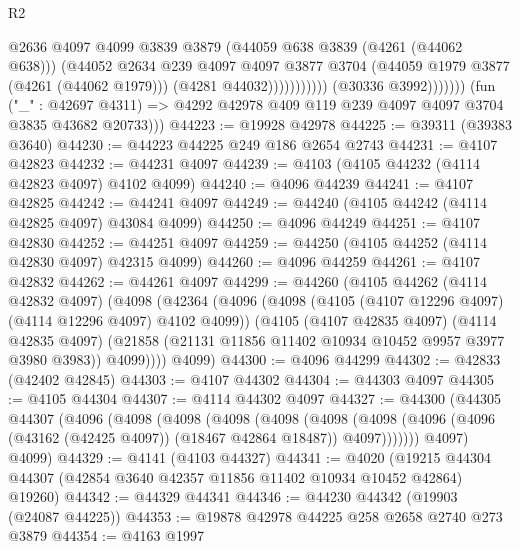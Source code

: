 \begin{lexlean}{R2}
\begin{coremodule}
                                      @2636
                                      @4097
                                      @4099
                                      @3839
                                      @3879
                                      (@44059 @638 @3839 (@4261 (@44062 @638)))
                                      (@44052
                                        @2634
                                        @239
                                        @4097
                                        @4097
                                        @3877
                                        @3704
                                        (@44059 @1979 @3877 (@4261 (@44062 @1979)))
                                        (@4281 @44032)))))))))))
                    (@30336 @3992)))))))
        (fun ("_" : @42697 @4311) =>
        @4292 @42978 @409 @119 @239 @4097 @4097 @3704 @3835 @43682 @20733)))
@44223 := @19928 @42978
@44225 := @39311 (@39383 @3640)
@44230 := @44223 @44225 @249 @186 @2654 @2743
@44231 := @4107 @42823
@44232 := @44231 @4097
@44239 := @4103 (@4105 @44232 (@4114 @42823 @4097) @4102 @4099)
@44240 := @4096 @44239
@44241 := @4107 @42825
@44242 := @44241 @4097
@44249 := @44240 (@4105 @44242 (@4114 @42825 @4097) @43084 @4099)
@44250 := @4096 @44249
@44251 := @4107 @42830
@44252 := @44251 @4097
@44259 := @44250 (@4105 @44252 (@4114 @42830 @4097) @42315 @4099)
@44260 := @4096 @44259
@44261 := @4107 @42832
@44262 := @44261 @4097
@44299 := @44260
    (@4105
      @44262
      (@4114 @42832 @4097)
      (@4098
        (@42364
          (@4096
            (@4098 (@4105 (@4107 @12296 @4097) (@4114 @12296 @4097) @4102 @4099))
            (@4105
              (@4107 @42835 @4097)
              (@4114 @42835 @4097)
              (@21858 (@21131 @11856 @11402 @10934 @10452 @9957 @3977 @3980 @3983))
              @4099))))
      @4099)
@44300 := @4096 @44299
@44302 := @42833 (@42402 @42845)
@44303 := @4107 @44302
@44304 := @44303 @4097
@44305 := @4105 @44304
@44307 := @4114 @44302 @4097
@44327 := @44300
    (@44305
      @44307
      (@4096
        (@4098
          (@4098
            (@4098
              (@4098
                (@4098
                  (@4098 (@4096 (@4096 (@43162 (@42425 @4097)) (@18467 @42864 @18487)) @4097)))))))
        @4097)
      @4099)
@44329 := @4141 (@4103 @44327)
@44341 := @4020
    (@19215 @44304 @44307 (@42854 @3640 @42357 @11856 @11402 @10934 @10452 @42864) @19260)
@44342 := @44329 @44341
@44346 := @44230 @44342 (@19903 (@24087 @44225))
@44353 := @19878 @42978 @44225 @258 @2658 @2740 @273 @3879
@44354 := @4163 @1997

\end{coremodule}
\end{lexlean}
